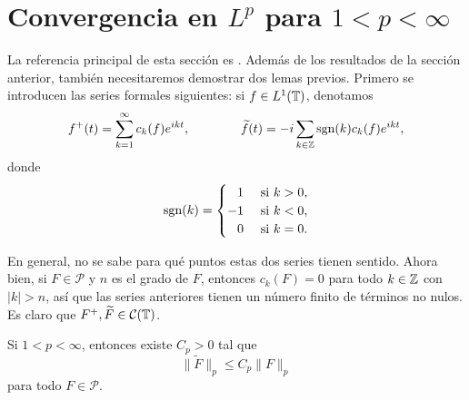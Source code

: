 \documentclass[a4paper, 12pt]{book}
\begin{document}
\section[Convergencia en \texorpdfstring{$L^p$}{Lp} para \texorpdfstring{$1<p<\infty$}{1<p<oo}]{Convergencia en \texorpdfstring{\boldmath$L^p$}{Lp} para \texorpdfstring{\boldmath$1<p<\infty$}{1<p<oo}}

La referencia principal de esta sección es \cite{miao}. Además de los resultados de la sección anterior, también necesitaremos demostrar dos lemas previos. Primero se introducen las series formales siguientes: si $f\in L^1(\mathbb T)$, denotamos
\[f^+(t) = \sum_{k=1}^\infty c_k(f)e^{ikt}, \qquad \qquad \widetilde{f}(t) = -i\sum_{k\in\mathbb Z} \textup{sgn}(k)c_k(f)e^{ikt},\]
donde
\[\sgn(k) = \begin{cases}
    \phantom{-}1 & $ si $ k > 0, \\
    -1 & $ si $ k < 0, \\
    \phantom{-}0 & $ si $ k = 0.
\end{cases}\]

En general, no se sabe para qué puntos estas dos series tienen sentido. Ahora bien, si $F \in \mathcal{P}$ y $n$ es el grado de $F$, entonces $c_k(F) = 0$ para todo $k\in\mathbb Z$ con $|k|>n$, así que las series anteriores tienen un número finito de términos no nulos. Es claro que $F^+, \widetilde{F}\in \mathcal{C}(\mathbb T)$.

\begin{lemma}
    Si $1 < p < \infty$, entonces existe $C_p > 0$ tal que
    \[\|\widetilde{F}\|_p \leq C_p \|F\|_{p}\]
    para todo $F \in \mathcal{P}$.
\end{lemma}
\end{document}
